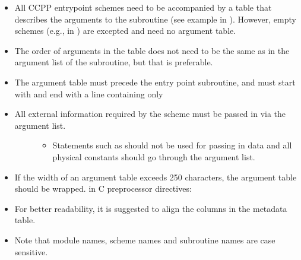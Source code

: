 \documentclass[letterpaper,10pt,english]{sphinxmanual}
\begin{document}
\begin{itemize}
\item {} 
All CCPP entrypoint schemes need to be accompanied by a table that describes the arguments to
the subroutine (see example in {\hyperref[\detokenize{CompliantPhysicsParams:scheme-template}]{}}).  However, empty schemes
(e.g.,  in {\hyperref[\detokenize{CompliantPhysicsParams:scheme-template}]{}}) are excepted and need
no argument table.

\item {} 
The order of arguments in the table does not need to be the same as in the argument list of
the subroutine, but that is preferable.

\item {} 
The argument table must precede the entry point subroutine, and must start with
 and end with a line containing only \sphinxcode{\sphinxupquote{!!}}

\item {} \begin{description}
\item[{All external information required by the scheme must be passed in via the argument list.}] \leavevmode\begin{itemize}
\item {} 
Statements such as  should not be used for passing in data and
all physical constants should go through the argument list.

\end{itemize}

\end{description}

\item {} 
If the width of an argument table exceeds 250 characters, the argument table should be wrapped.
in C preprocessor directives:

\end{itemize}

\begin{sphinxVerbatim}[commandchars=\\\{\}]
\end{sphinxVerbatim}
\begin{itemize}
\item {} 
For better readability, it is suggested to align the columns in the metadata table.

\item {} 
Note that module names, scheme names and subroutine names are case sensitive.

\end{itemize}
\end{document}
